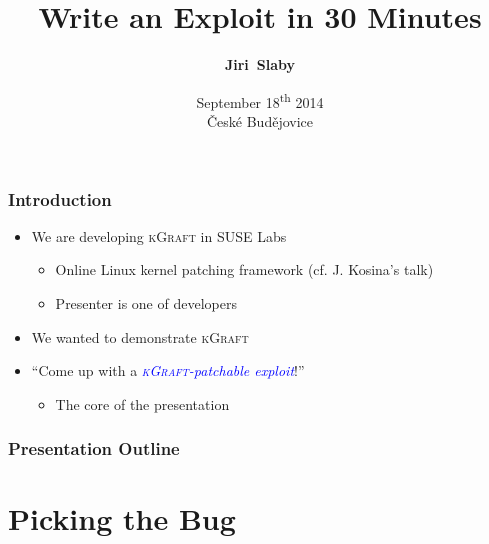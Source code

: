 \documentclass[xcolor=dvipsnames]{beamer}
\title{Write an Exploit in 30 Minutes}
\date[September 18\textsuperscript{th} 2014, ČB]{September
18\textsuperscript{th} 2014 \\ České Budějovice}
\author[Jiri~Slaby]{\textbf{Jiri~Slaby}}
\institute{SUSE Labs}
\let\Oldemph\emph
\renewcommand{\emph}[1]{\textcolor{blue}{\Oldemph{#1}}}
\newcommand\kgr{\textsc{kGraft}\xspace}
\begin{document}
\begin{frame}
  \titlepage
\end{frame}


\begin{frame}
  \frametitle{Introduction}

  \begin{itemize}
    \item We are developing \kgr in SUSE Labs
    \begin{itemize}
      \item Online Linux kernel patching framework (cf. J. Kosina's talk)
      \item Presenter is one of developers
    \end{itemize}

    \pause

    \item We wanted to demonstrate \kgr

    \pause

    \item ``Come up with a \emph{\kgr-patchable exploit}!''

    \pause

    \begin{itemize}
      \item The core of the presentation
    \end{itemize}

  \end{itemize}

\end{frame}

\begin{frame}
  \frametitle{Presentation Outline}

  \tableofcontents

\end{frame}

\section{Picking the Bug}
\end{document}
